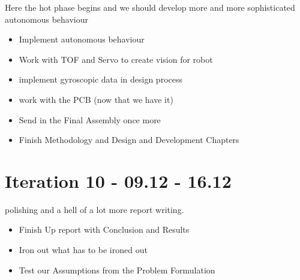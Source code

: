 \documentclass[a4paper, 12pt]{report}
\begin{document}
Here the hot phase begins and we should develop more and more
sophisticated autonomous behaviour

\begin{itemize}
    \item Implement autonomous behaviour
    \item Work with TOF and Servo to create vision for robot
    \item implement gyroscopic data in design process
    \item work with the PCB (now that we have it)
    \item Send in the Final Assembly once more
    \item Finish Methodology and Design and Development Chapters
\end{itemize}

\section*{Iteration 10 - 09.12 - 16.12}

polishing and a hell of a lot more report writing.

\begin{itemize}
    \item Finish Up report with Conclusion and Results
    \item Iron out what has to be ironed out
    \item Test our Assumptions from the Problem Formulation
\end{itemize}
\end{document}
